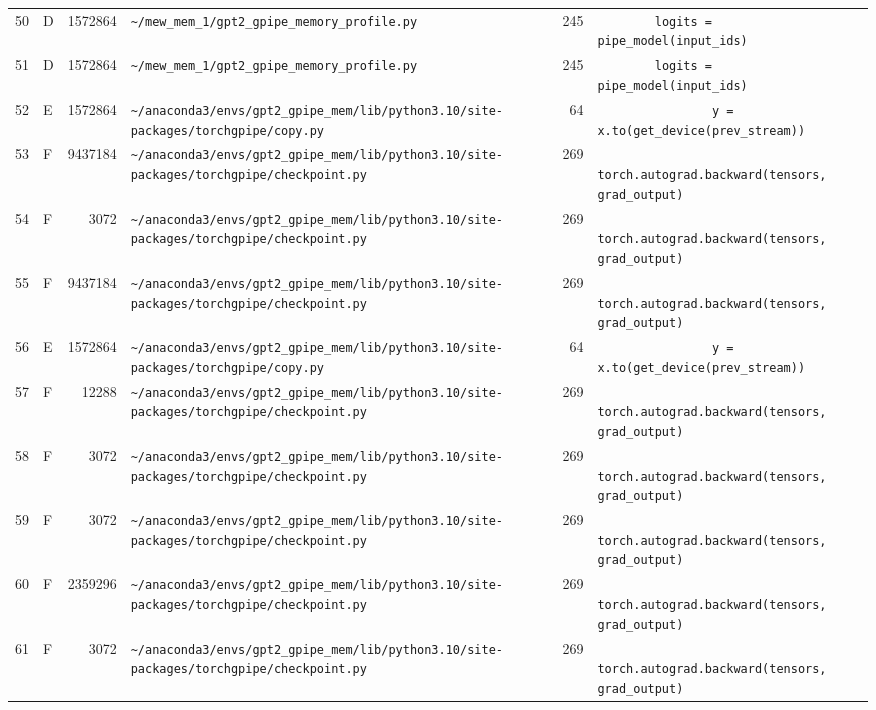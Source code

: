 \documentclass{article}
\begin{document}
\begin{longtable}{r l r p{6.5cm} r p{7.0cm}}
50 & D & 1572864 & \lstinline|~/mew_mem_1/gpt2_gpipe_memory_profile.py| & 245 & \lstinline|        logits = pipe_model(input_ids)| \\
51 & D & 1572864 & \lstinline|~/mew_mem_1/gpt2_gpipe_memory_profile.py| & 245 & \lstinline|        logits = pipe_model(input_ids)| \\
52 & E & 1572864 & \lstinline|~/anaconda3/envs/gpt2_gpipe_mem/lib/python3.10/site-packages/torchgpipe/copy.py| & 64 & \lstinline|                y = x.to(get_device(prev_stream))| \\
53 & F & 9437184 & \lstinline|~/anaconda3/envs/gpt2_gpipe_mem/lib/python3.10/site-packages/torchgpipe/checkpoint.py| & 269 & \lstinline|            torch.autograd.backward(tensors, grad_output)| \\
54 & F & 3072 & \lstinline|~/anaconda3/envs/gpt2_gpipe_mem/lib/python3.10/site-packages/torchgpipe/checkpoint.py| & 269 & \lstinline|            torch.autograd.backward(tensors, grad_output)| \\
55 & F & 9437184 & \lstinline|~/anaconda3/envs/gpt2_gpipe_mem/lib/python3.10/site-packages/torchgpipe/checkpoint.py| & 269 & \lstinline|            torch.autograd.backward(tensors, grad_output)| \\
56 & E & 1572864 & \lstinline|~/anaconda3/envs/gpt2_gpipe_mem/lib/python3.10/site-packages/torchgpipe/copy.py| & 64 & \lstinline|                y = x.to(get_device(prev_stream))| \\
57 & F & 12288 & \lstinline|~/anaconda3/envs/gpt2_gpipe_mem/lib/python3.10/site-packages/torchgpipe/checkpoint.py| & 269 & \lstinline|            torch.autograd.backward(tensors, grad_output)| \\
58 & F & 3072 & \lstinline|~/anaconda3/envs/gpt2_gpipe_mem/lib/python3.10/site-packages/torchgpipe/checkpoint.py| & 269 & \lstinline|            torch.autograd.backward(tensors, grad_output)| \\
59 & F & 3072 & \lstinline|~/anaconda3/envs/gpt2_gpipe_mem/lib/python3.10/site-packages/torchgpipe/checkpoint.py| & 269 & \lstinline|            torch.autograd.backward(tensors, grad_output)| \\
60 & F & 2359296 & \lstinline|~/anaconda3/envs/gpt2_gpipe_mem/lib/python3.10/site-packages/torchgpipe/checkpoint.py| & 269 & \lstinline|            torch.autograd.backward(tensors, grad_output)| \\
61 & F & 3072 & \lstinline|~/anaconda3/envs/gpt2_gpipe_mem/lib/python3.10/site-packages/torchgpipe/checkpoint.py| & 269 & \lstinline|            torch.autograd.backward(tensors, grad_output)| \\

\end{longtable}
\end{document}
